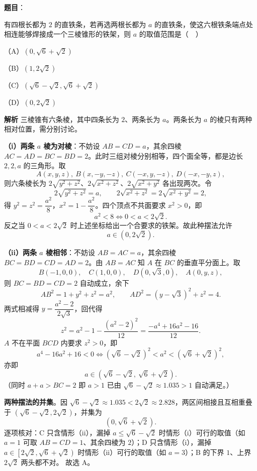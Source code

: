 \begin{answer}

\textbf{题目}：

有四根长都为 $2$ 的直铁条，若再选两根长都为 $a$ 的直铁条，使这六根铁条端点处相连能够焊接成一个三棱锥形的铁架，则 $a$ 的取值范围是（　）

（A）$(0,\sqrt6+\sqrt2)$

（B）$(1,2\sqrt2)$

（C）$(\sqrt6-\sqrt2,\sqrt6+\sqrt2)$

（D）$(0,2\sqrt2)$

\textbf{解析}
三棱锥有六条棱，其中四条长为 $2$、两条长为 $a$。两条长为 $a$ 的棱只有两种相对位置，需分别讨论。

\textbf{（i）两条 $a$ 棱为对棱}：不妨设 $AB=CD=a$，其余四棱 $AC=AD=BC=BD=2$。此时三组对棱分别相等，四个面全等，都是边长 $2,2,a$ 的三角形。取
\nopagebreak[4]
\[A(x,y,z),\ B(x,-y,-z),\ C(-x,y,-z),\ D(-x,-y,z),\]
则六条棱长为 $2\sqrt{y^2+z^2}$、$2\sqrt{x^2+z^2}$、$2\sqrt{x^2+y^2}$ 各出现两次。令
\nopagebreak[4]
\[2\sqrt{y^2+z^2}=a,\qquad 2\sqrt{x^2+z^2}=2\sqrt{x^2+y^2}=2,\]
得 $y^2=z^2=\dfrac{a^2}{8}$，$x^2=1-\dfrac{a^2}{8}$。四个顶点不共面要求 $x^2>0$，即
\nopagebreak[4]
\[a^2<8\iff 0<a<2\sqrt2.\]
反之当 $0<a<2\sqrt2$ 时上述坐标给出一个合要求的铁架。故此种摆法允许
\nopagebreak[4]
\[a\in\left(0,2\sqrt2\right).\]

\textbf{（ii）两条 $a$ 棱相邻}：不妨设 $AB=AC=a$，其余四棱 $BC=BD=CD=AD=2$。由 $AB=AC$ 知 $A$ 在 $BC$ 的垂直平分面上。取
\nopagebreak[4]
\[B(-1,0,0),\quad C(1,0,0),\quad D(0,\sqrt3,0),\quad A(0,y,z),\]
则 $BC=BD=CD=2$ 自动成立，余下
\nopagebreak[4]
\[AB^2=1+y^2+z^2=a^2,\qquad AD^2=(y-\sqrt3)^2+z^2=4.\]
两式相减得 $y=\dfrac{a^2-2}{2\sqrt3}$，回代得
\nopagebreak[4]
\[z^2=a^2-1-\frac{(a^2-2)^2}{12}=\frac{-a^4+16a^2-16}{12}.\]
$A$ 不在平面 $BCD$ 内要求 $z^2>0$，即
\nopagebreak[4]
\[a^4-16a^2+16<0\iff\left(\sqrt6-\sqrt2\right)^2<a^2<\left(\sqrt6+\sqrt2\right)^2,\]
亦即
\nopagebreak[4]
\[a\in\left(\sqrt6-\sqrt2,\ \sqrt6+\sqrt2\right).\]
（同时 $a+a>BC=2$ 即 $a>1$ 已由 $\sqrt6-\sqrt2\approx1.035>1$ 自动满足。）

\textbf{两种摆法的并集}。因 $\sqrt6-\sqrt2\approx1.035<2\sqrt2\approx2.828$，两区间相接且互相重叠于 $\left(\sqrt6-\sqrt2,2\sqrt2\right)$，并集为
\nopagebreak[4]
\[\left(0,\sqrt6+\sqrt2\right).\]
逐项核对：C 只含情形（ii），漏掉 $a\leqslant\sqrt6-\sqrt2$ 时情形（i）可行的取值（如 $a=1$ 可取 $AB=CD=1$、其余四棱为 $2$）；D 只含情形（i），漏掉 $a\in\left[2\sqrt2,\sqrt6+\sqrt2\right)$ 时情形（ii）可行的取值（如 $a=3$）；B 的下界 $1$、上界 $2\sqrt2$ 两头都不对。
故选 A。


\end{answer}
